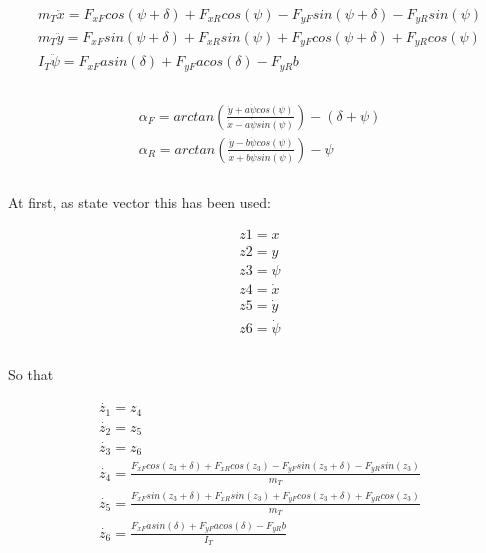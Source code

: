 \documentclass{report}
\begin{document}
\begin{equation}
\begin{aligned}
m_T \ddot{x} = F_{xF} cos(\psi+\delta) + F_{xR} cos(\psi) - F_{yF} sin(\psi+\delta) - F_{yR} sin(\psi) \\
m_T \ddot{y} = F_{xF} sin(\psi+\delta) + F_{xR} sin(\psi) + F_{yF} cos(\psi+\delta) + F_{yR} cos(\psi) \\
I_T \ddot{\psi} = F_{xF} a sin(\delta) + F_{yF} a cos(\delta) - F_{yR} b\\\\
\end{aligned}
\end{equation}

\begin{equation}
\begin{aligned}
\alpha_F = arctan(\frac{\dot{y}+a\dot{\psi}cos(\psi)}{\dot{x}-a\dot{\psi}sin(\psi)}) - (\delta + \psi)\\
\alpha_R = arctan(\frac{\dot{y}-b\dot{\psi}cos(\psi)}{\dot{x}+b\dot{\psi}sin(\psi)}) - \psi\\\\
\end{aligned}
\end{equation}

At first, as state vector this has been used:

\begin{equation}
\begin{aligned}
z1 = x\\
z2 = y\\
z3 = \psi\\
z4 = \dot{x}\\
z5 = \dot{y}\\
z6 = \dot{\psi}\\\\
\end{aligned}
\end{equation}

So that

\begin{equation}
\begin{aligned}
\dot{z_1} = z_4 \\
\dot{z_2} = z_5 \\
\dot{z_3} = z_6 \\
\dot{z_4} = \frac{F_{xF} cos(z_3+\delta) + F_{xR} cos(z_3) - F_{yF} sin(z_3+\delta) - F_{yR} sin(z_3)}{m_T} \\
\dot{z_5} = \frac{F_{xF} sin(z_3+\delta) + F_{xR} sin(z_3) + F_{yF} cos(z_3+\delta) + F_{yR} cos(z_3)}{m_T} \\
\dot{z_6} = \frac{F_{xF} a sin(\delta) + F_{yF} a cos(\delta) - F_{yR} b}{I_T} \\\\
\end{aligned}
\end{equation}
\end{document}
